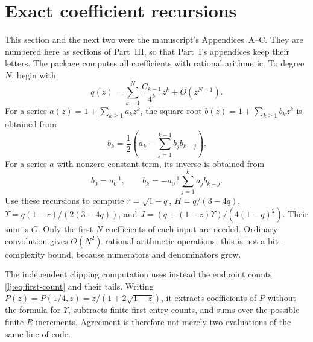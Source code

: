 \documentclass[11pt,a4paper]{article}
\theoremstyle{definition}\newaliascnt{definition}{theorem}
\theoremstyle{remark}\newaliascnt{remark}{theorem}
\newcommand{\ljU}{\Upsilon}
\begin{document}
\section{Exact coefficient recursions}
\label{lj:app:recursions}
This section and the next two were the manuscript's Appendices~A--C. They
are numbered here as sections of Part~III, so that Part~I's appendices keep
their letters. The package computes all coefficients with rational arithmetic. To degree
$N$, begin with
\[
 q(z)=\sum_{k=1}^N\frac{C_{k-1}}{4^k}z^k+O(z^{N+1}).
\]
For a series $a(z)=1+\sum_{k\ge1}a_kz^k$, the square root
$b(z)=1+\sum_{k\ge1}b_kz^k$ is obtained from
\begin{equation}
 b_k=\frac12\left(a_k-\sum_{j=1}^{k-1}b_jb_{k-j}\right).
 \label{lj:eq:sqrt-recursion}
\end{equation}
For a series $a$ with nonzero constant term, its inverse is obtained from
\begin{equation}
 b_0=a_0^{-1},\qquad
 b_k=-a_0^{-1}\sum_{j=1}^k a_jb_{k-j}.
 \label{lj:eq:inverse-recursion}
\end{equation}
Use these recursions to compute $r=\sqrt{1-q}$,
$H=q/(3-4q)$,
$\ljU=q(1-r)/(2(3-4q))$, and
$J=(q+(1-z)\ljU)/(4(1-q)^2)$. Their sum is $G$.
Only the first $N$ coefficients of each input are needed. Ordinary
convolution gives $O(N^2)$ rational arithmetic operations; this is not a
bit-complexity bound, because numerators and denominators grow.

The independent clipping computation uses instead the endpoint counts
\eqref{lj:eq:first-count} and their tails. Writing
$P(z)=P(1/4,z)=z/(1+2\sqrt{1-z})$, it extracts coefficients of $P$
without the formula for $\ljU$, subtracts finite first-entry counts,
and sums over the possible finite $R$-increments. Agreement is therefore
not merely two evaluations of the same line of code.
\end{document}

